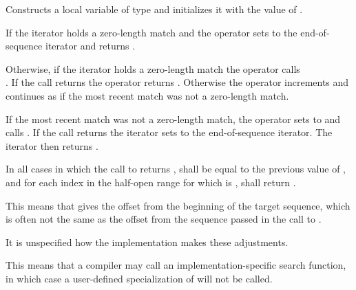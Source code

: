 \begin{itemdescr}
\pnum
\effects  Constructs a local variable  of type  and
initializes it with the value of .

\pnum
If the iterator holds a zero-length match and  the operator
sets  to the end-of-sequence iterator and returns .

\pnum
{}%
%
Otherwise, if the iterator holds a zero-length match the operator calls
\\. If the call returns  the operator
returns . Otherwise the operator increments  and continues as if
the most recent match was not a zero-length match.

\pnum
{}%
If the most recent match was not a zero-length match, the operator sets
 to  and
calls . If the call returns
 the iterator sets  to the end-of-sequence iterator. The
iterator then returns .

\pnum
In all cases in which the call to  returns ,
 shall be equal to the previous value of
, and for each index  in the half-open range
\tcode{[0, match.size())} for which  is ,
shall return .

\pnum
\begin{note} This means that  gives the
offset from the beginning of the target sequence, which is often not
the same as the offset from the sequence passed in the call
to . \end{note}

\pnum
It is unspecified how the implementation makes these adjustments.

\pnum
\begin{note} This means that a compiler may call an
implementation-specific search function, in which case a user-defined
specialization of  will not be
called. \end{note}
\end{itemdescr}

